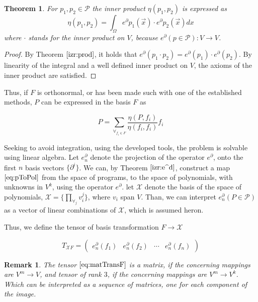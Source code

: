 \documentclass{article}
\newcommand{\X}{\mathcal{X}}
\newcommand{\dP}{\mathcal{P}}
\newcommand{\D}{\partial}
\newtheorem{izrek}{Theorem}[section]
\newtheorem{opomba}{Remark}[section]
\begin{document}
  \begin{izrek}
  For $p_1,p_2\in\dP$ the inner product $\eta(p_1,p_2)$ is expressed as
  \begin{equation}
  	\eta(p_1,p_2)=\int_{\Omega}e^\D p_1(\vec{x})\cdot e^\D p_2(\vec{x})dx
  \end{equation}
  where $\cdot$ stands for the inner product on $V$, because $e^\D(p\in\dP):V\to V$.
  \end{izrek}
  
  \begin{proof}
  By Theorem $\ref{izr:prod}$, it holds that $e^\D(p_1\cdot p_2)=e^\D(p_1)\cdot e^\D(p_2)$. By linearity of the integral and a well defined inner product on $V$, the axioms of the inner product are satisfied.
  \end{proof}
  
  Thus, if $F$ is orthonormal, or has been made such with one of the established methods, $P$ can be expressed in the basis $F$ as
  
  \begin{equation}
 	P=\sum\limits_{\forall_{f_i\in F}}\frac{\eta(P,f_i)}{\eta(f_i,f_i)}f_i
  \end{equation}
  
  Seeking to avoid integration, using the developed tools, the problem is solvable using linear algebra. Let $e^\D_n$ denote the projection of the operator $e^\D$, onto the first $n$ basis vectors $\{\D^i\}$. We can, by Theorem $\ref{izr:e^d}$, construct a map $\eqref{eq:pToPol}$ from the space of programs, to the space of polynomials, with unknowns in $V^k$, using the operator $e^\D$. let $\X$ denote the basis of the space of polynomials, $\X=\{\prod\limits_{\forall_j} v_i^j\}$, where $v_i$ span $V$. Than, we can interpret $e^\D_n(P\in\dP)$ as a vector of linear combinations of $\X$, which is assumed heron.
  
  Thus, we define the tensor of basis transformation $F\to\X$
  
  \begin{equation}\label{eq:matTransF}
  T_{\X F}=\begin{pmatrix}
  e_n^\D(f_1) & e_n^\D(f_2) & \cdots & e_n^\D(f_n)
  \end{pmatrix}
  \end{equation}
  
  \begin{opomba}
  The tensor $\eqref{eq:matTransF}$ is a matrix, if the concerning mappings are $V^m\to V$, and tensor of rank $3$, if the concerning mappings are $V^m\to V^k$. Which can be interpreted as a sequence of matrices, one for each component of the image.
  \end{opomba}
  
\end{document}
